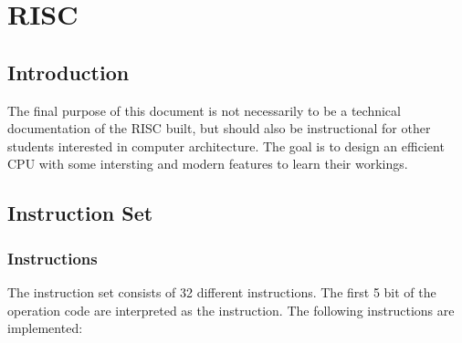 \documentclass[twoside]{article}
\begin{document}
\section*{RISC}
\subsection*{Introduction}
The final purpose of this document is not necessarily to be a technical
documentation of the RISC built, but should also be instructional for
other students interested in computer architecture. The goal is to design an
efficient CPU with some intersting and modern features to learn their workings.
\subsection*{Instruction Set}
\subsubsection*{Instructions}
The instruction set consists of 32 different instructions. The first 5 bit of
the operation code are interpreted as the instruction. The following
instructions are implemented:
\end{document}

